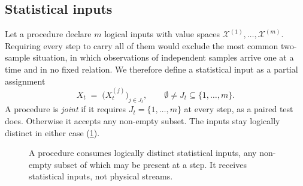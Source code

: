 \documentclass[11pt,a4paper]{article}
\theoremstyle{definition}
\theoremstyle{remark}
\newcommand{\Input}{\mathcal{X}}
\begin{document}
\subsection{Statistical inputs}
\label{sec:multiple-inputs}

Let a procedure declare $m$ logical inputs with value spaces
$\Input^{(1)},\ldots,\Input^{(m)}$. Requiring every step to carry all of
them would exclude the most common two-sample situation, in which
observations of independent samples arrive one at a time and in no fixed
relation. We therefore define a statistical input as a partial
assignment
\begin{equation}
X_t \;=\; \bigl(X_t^{(j)}\bigr)_{j\in J_t},
\qquad \emptyset\neq J_t\subseteq\{1,\ldots,m\}.
\label{eq:multi-input}
\end{equation}
A procedure is \emph{joint} if it requires $J_t=\{1,\ldots,m\}$ at every
step, as a paired test does. Otherwise it accepts any non-empty subset.
The inputs stay logically distinct in either case
(\cref{fig:procedure}).

\begin{figure}[t]
\centering
{}
\caption{
A procedure consumes logically distinct statistical inputs, any
non-empty subset of which may be present at a step. It receives
statistical inputs, not physical streams.
}
\label{fig:procedure}
\end{figure}
\end{document}
